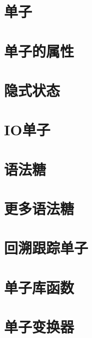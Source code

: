 \documentclass[11pt]{article} %
\begin{document}
\section{单子}
\section{单子的属性}
\section{隐式状态}
\section{IO单子}
\section{语法糖}
\section{更多语法糖}
\section{回溯跟踪单子}
\section{单子库函数}
\section{单子变换器}
\end{document}
